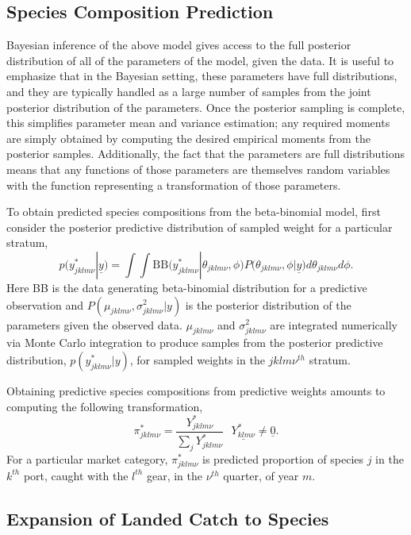 \documentclass[12pt]{article}
\begin{document}
%
%
\subsection{Species Composition Prediction}\label{prediction}
%
%

%
Bayesian inference of the above model gives access to the full posterior 
distribution of all of the parameters of the model, given the data. It is 
useful to emphasize that in the Bayesian setting, these parameters have full 
distributions, and they are typically handled as a large number of samples 
from the joint posterior distribution of the parameters. Once the posterior 
sampling is complete, this simplifies parameter mean and variance estimation; 
any required moments are simply obtained by computing the desired empirical 
moments from the posterior samples. Additionally, the fact that the 
parameters are full distributions means that any functions of those parameters 
are themselves random variables with the function representing a 
transformation of those parameters.

%
To obtain predicted species compositions from the beta-binomial model, first 
consider the posterior predictive distribution of sampled weight for a 
particular stratum,
%
\[p(y^*_{jklm\nu}|\underline{y}) = \int\!\!\!\!\int\! \text{BB}\Big( y^*_{jklm\nu}|\theta_{jklm\nu}, \phi \Big) P\Big(\theta_{jklm\nu}, \phi | \underline{y}\Big) d\theta_{jklm\nu} d\phi.\]
%
Here BB is the data generating beta-binomial distribution for a
predictive observation and \(P(\mu_{jklm\nu}, \sigma^2_{jklm\nu}|y)\)
is the posterior distribution of the parameters given the observed data.
\(\mu_{jklm\nu}\) and \(\sigma^2_{jklm\nu}\) are integrated numerically via 
Monte Carlo integration to produce samples from the posterior predictive 
distribution, \(p(y^*_{jklm\nu}|y)\), for sampled weights in the 
\(jklm\nu^{th}\) stratum.  

%
Obtaining predictive species compositions from predictive weights
amounts to computing the following transformation,
%
\[\pi^*_{jklm\nu} = \frac{Y^*_{jklm\nu}}{\sum_j Y^*_{jklm\nu}} ~~~ \underline{Y^*_{klm\nu}}\neq \underline{0}.\]
%
For a particular market category, \(\pi^*_{jklm\nu}\) is predicted
proportion of species \(j\) in the \(k^{th}\) port, caught with the
\(l^{th}\) gear, in the \(\nu^{th}\) quarter, of year \(m\).

%
%
\subsection{Expansion of Landed Catch to Species}\label{expansion}
%
%
\end{document}
